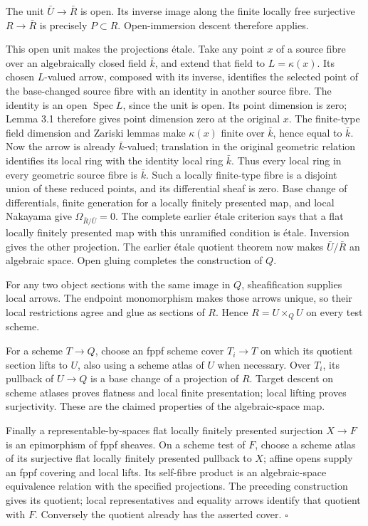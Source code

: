 \documentclass[11pt,a4paper,openany]{report}
\begin{document}
The unit \(\bar U\to\bar R\) is open. Its inverse image along the finite locally free surjective \(R\to\bar R\) is precisely \(P\subset R\). Open-immersion descent therefore applies.

This open unit makes the projections étale. Take any point \(x\) of a source fibre over an algebraically closed field \(\bar k\), and extend that field to \(L=\kappa(x)\). Its chosen \(L\)-valued arrow, composed with its inverse, identifies the selected point of the base-changed source fibre with an identity in another source fibre. The identity is an open \(\operatorname{Spec}L\), since the unit is open. Its point dimension is zero; Lemma 3.1 therefore gives point dimension zero at the original \(x\). The finite-type field dimension and Zariski lemmas make \(\kappa(x)\) finite over \(\bar k\), hence equal to \(\bar k\). Now the arrow is already \(\bar k\)-valued; translation in the original geometric relation identifies its local ring with the identity local ring \(\bar k\). Thus every local ring in every geometric source fibre is \(\bar k\). Such a locally finite-type fibre is a disjoint union of these reduced points, and its differential sheaf is zero. Base change of differentials, finite generation for a locally finitely presented map, and local Nakayama give \(\Omega_{\bar R/\bar U}=0\). The complete earlier étale criterion says that a flat locally finitely presented map with this unramified condition is étale. Inversion gives the other projection. The earlier étale quotient theorem now makes \(\bar U/\bar R\) an algebraic space. Open gluing completes the construction of \(Q\).

For any two object sections with the same image in \(Q\), sheafification supplies local arrows. The endpoint monomorphism makes those arrows unique, so their local restrictions agree and glue as sections of \(R\). Hence \(R=U\times_Q U\) on every test scheme.

For a scheme \(T\to Q\), choose an fppf scheme cover \(T_i\to T\) on which its quotient section lifts to \(U\), also using a scheme atlas of \(U\) when necessary. Over \(T_i\), its pullback of \(U\to Q\) is a base change of a projection of \(R\). Target descent on scheme atlases proves flatness and local finite presentation; local lifting proves surjectivity. These are the claimed properties of the algebraic-space map.

Finally a representable-by-spaces flat locally finitely presented surjection \(X\to F\) is an epimorphism of fppf sheaves. On a scheme test of \(F\), choose a scheme atlas of its surjective flat locally finitely presented pullback to \(X\); affine opens supply an fppf covering and local lifts. Its self-fibre product is an algebraic-space equivalence relation with the specified projections. The preceding construction gives its quotient; local representatives and equality arrows identify that quotient with \(F\). Conversely the quotient already has the asserted cover. \(\square\)
\end{document}
